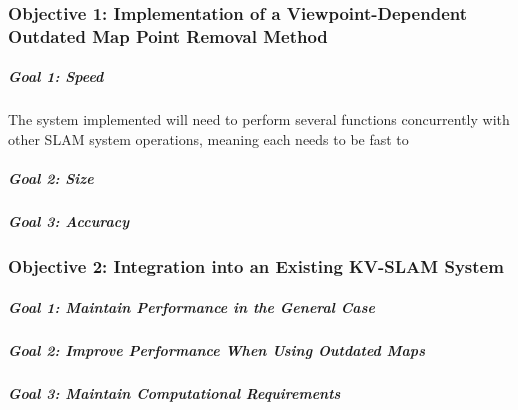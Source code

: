 \subsubsection*{Objective 1: Implementation of a Viewpoint-Dependent Outdated Map Point Removal Method}

\subparagraph{Goal 1: Speed}

The system implemented will need to perform several functions concurrently with other SLAM system operations, meaning each needs to be fast to 

\subparagraph{Goal 2: Size}
\subparagraph{Goal 3: Accuracy}

\subsubsection*{Objective 2: Integration into an Existing KV-SLAM System}

\subparagraph{Goal 1: Maintain Performance in the General Case}
\subparagraph{Goal 2: Improve Performance When Using Outdated Maps}
\subparagraph{Goal 3: Maintain Computational Requirements}






